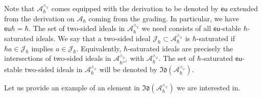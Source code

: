 \documentclass[12pt]{amsart}
\newcommand{\A}{\mathcal{A}}
\theoremstyle{definition}
\begin{document}
Note that $\A_\hbar^{\wedge_x}$ comes equipped with the derivation to be denoted by $\mathsf{eu}$
extended  from the derivation on $\A_\hbar$ coming from the grading. In particular,
we have $\mathsf{eu}\hbar=\hbar$.  The set of two-sided ideals in $\A_\hbar^{\wedge_x}$ we need  consists of
all $\mathsf{eu}$-stable $\hbar$-saturated ideals. We say that a two-sided ideal $\mathcal{J}_\hbar
\subset \A_\hbar^{\wedge_x}$ is $\hbar$-saturated if $\hbar a\in \mathcal{J}_\hbar$
implies $a\in \mathcal{J}_\hbar$. Equivalently, $\hbar$-saturated ideals are precisely the intersections
of two-sided ideals in $\A^{\wedge_x}_{\hbar^{\pm 1}}$ with $\A_\hbar^{\wedge_x}$.
The set of $\hbar$-saturated $\mathsf{eu}$-stable two-sided ideals in $\A_\hbar^{\wedge_x}$
will be denoted by $\mathfrak{Id}(\A_\hbar^{\wedge_x})$.

Let us provide an example of an element in $\mathfrak{Id}(\A_\hbar^{\wedge_x})$ we are interested in.
\end{document}
